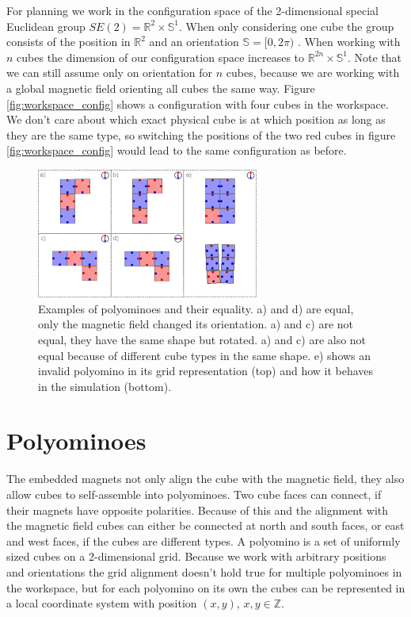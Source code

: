 For planning we work in the configuration space of the 2-dimensional special Euclidean group $SE(2) = \mathbb{R}^2 \times \mathbb{S}^1$.
When only considering one cube the group consists of the position in $\mathbb{R}^2$ and an orientation $\mathbb{S} = [0,2\pi)$ \cite{LaValle2006}.
When working with $n$ cubes the dimension of our configuration space increases to $\mathbb{R}^{2n} \times \mathbb{S}^1$.
Note that we can still assume only on orientation for $n$ cubes, because we are working with a global magnetic field orienting all cubes the same way.
Figure \ref{fig:workspace_config} shows a configuration with four cubes in the workspace.
We don't care about which exact physical cube is at which position as long as they are the same type, so switching the positions of the two red cubes in figure \ref{fig:workspace_config} would lead to the same configuration as before.

\begin{figure}
	\centering
	\includegraphics[width=0.65\textwidth]{figures/polyominoes.pdf}
	\caption{Examples of polyominoes and their equality. a) and d) are equal, only the magnetic field changed its orientation. a) and c) are not equal, they have the same shape but rotated. a) and c) are also not equal because of different cube types in the same shape. e) shows an invalid polyomino in its grid representation (top) and how it behaves in the simulation (bottom).}
	\label{fig:polyominoes}
\end{figure}

\section{Polyominoes}
The embedded magnets not only align the cube with the magnetic field, they also allow cubes to self-assemble into polyominoes.
Two cube faces can connect, if their magnets have opposite polarities.
Because of this and the alignment with the magnetic field cubes can either be connected at north and south faces, or east and west faces, if the cubes are different types.
A polyomino is a set of uniformly sized cubes on a 2-dimensional grid.
Because we work with arbitrary positions and orientations the grid alignment doesn't hold true for multiple polyominoes in the workspace, but for each polyomino on its own the cubes can be represented in a local coordinate system with position $(x,y)$, $x,y \in \mathbb{Z}$.

